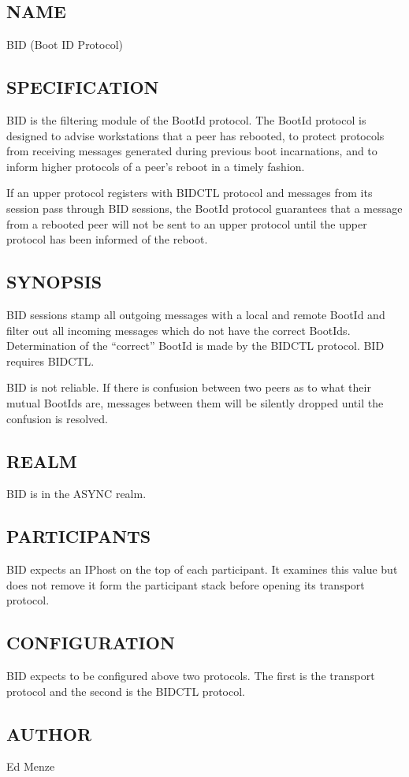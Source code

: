 %
%
%

\subsection*{NAME}

\noindent BID (Boot ID Protocol)

\subsection*{SPECIFICATION}

\noindent 

BID is the filtering module of the BootId protocol. 
The BootId protocol is designed to advise workstations that a peer has
rebooted, to protect protocols from receiving messages generated
during previous boot incarnations, and to inform higher protocols of a
peer's reboot in a timely fashion.

If an upper protocol registers with BIDCTL protocol and messages
from its session pass through BID sessions, the BootId protocol
guarantees that a message from a rebooted peer will not be sent to an
upper protocol until the upper protocol has been informed of the
reboot.  

\subsection*{SYNOPSIS}

BID sessions stamp all outgoing messages with a local and remote
BootId and filter out all incoming messages which do not have the
correct BootIds.  Determination of the ``correct'' BootId is made by
the BIDCTL protocol.  BID requires BIDCTL.

BID is not reliable.  If there is confusion between two peers as to
what their mutual BootIds are, messages between them will be silently
dropped until the confusion is resolved.

\subsection*{REALM}

BID is in the ASYNC realm.

\subsection*{PARTICIPANTS}

BID expects an IPhost on the top of each participant.  It examines
this value but does not remove it form the participant stack before
opening its transport protocol.

\subsection*{CONFIGURATION}

BID expects to be configured above two protocols.  The first is the
transport protocol and the second is the BIDCTL protocol.

\subsection*{AUTHOR}

\noindent Ed Menze

